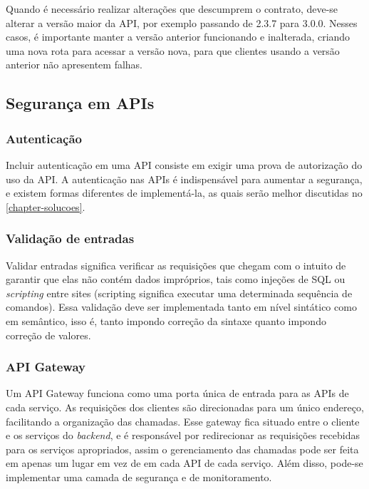 Quando é necessário realizar alterações que descumprem o contrato, deve-se alterar a versão maior da API, por exemplo passando de 2.3.7 para 3.0.0. Nesses casos, é importante manter a versão anterior funcionando e inalterada, criando uma nova rota para acessar a versão nova, para que clientes usando a versão anterior não apresentem falhas.

\subsection{Segurança em APIs}

\subsubsection*{Autenticação}

Incluir autenticação em uma API consiste em exigir uma prova de autorização do uso da API. A autenticação nas APIs é indispensável para aumentar a segurança, e existem formas diferentes de implementá-la, as quais serão melhor discutidas no \autoref{chapter-solucoes}.

\subsubsection*{Validação de entradas}

Validar entradas significa verificar as requisições que chegam com o intuito de garantir que elas não contém dados impróprios, tais como injeções de SQL ou \emph{scripting} entre sites (scripting significa executar uma determinada sequência de comandos). Essa validação deve ser implementada tanto em nível sintático como em semântico, isso é, tanto impondo correção da sintaxe quanto impondo correção de valores. \cite{rapidAPI-twitter}

\subsubsection*{API Gateway}
Um API Gateway funciona como uma porta única de entrada para as APIs de cada serviço. As requisições dos clientes são direcionadas para um único endereço, facilitando a organização das chamadas. Esse gateway fica situado entre o cliente e os serviços do \emph{backend}, e é responsável por redirecionar as requisições recebidas para os serviços apropriados, assim o gerenciamento das chamadas pode ser feita em apenas um lugar em vez de em cada API de cada serviço. Além disso, pode-se implementar uma camada de segurança e de monitoramento. \cite{rapidAPI-twitter}

